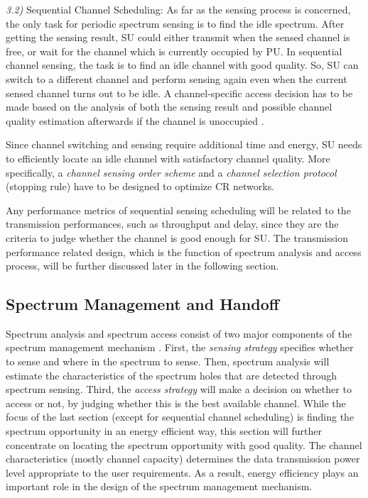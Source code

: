 \documentclass[journal,12pt,onecolumn]{IEEEtran}
\begin{document}
\emph{3.2)} {Sequential Channel Scheduling:} As far as the sensing process is concerned, the only task for periodic spectrum sensing is to find the idle spectrum. After getting the sensing result, SU could either transmit when the sensed channel is free, or wait for the channel which is currently occupied by PU. In sequential channel sensing, the task is to find an idle channel with good quality. So, SU can switch to a different channel and perform sensing again even when the current sensed channel turns out to be idle. A channel-specific access decision has to be made based on the analysis of both the sensing result and possible channel quality estimation afterwards if the channel is unoccupied \cite{4786510}. 

Since channel switching and sensing require additional time and energy, SU needs to efficiently locate an idle channel with satisfactory channel quality. More specifically, a \emph{channel sensing order scheme} and a \emph{channel selection protocol} (stopping rule) have to be designed to optimize CR networks.



Any performance metrics of sequential sensing scheduling will be related to the transmission performances, such as throughput and delay, since they are the criteria to judge whether the channel is good enough for SU. The transmission performance related design, which is the function of spectrum analysis and access process, will be further discussed later in the following section.

\subsection{Spectrum Management and Handoff}
Spectrum analysis and spectrum access consist of two major components of the spectrum management mechanism \cite{HO}. First, the \emph{sensing strategy} specifies whether to sense and where in the spectrum to sense. Then, spectrum analysis will estimate the characteristics of the spectrum holes that are detected through spectrum sensing. Third, the \emph{access strategy} will make a decision on whether to access or not, by judging whether this is the best available channel. While the focus of the last section (except for sequential channel scheduling) is finding the spectrum opportunity in an energy efficient way, this section will further concentrate on locating the spectrum opportunity with good quality. The channel characteristics (mostly channel capacity) determines the data transmission power level appropriate to the user requirements. As a result, energy efficiency plays an important role in the design of the spectrum management mechanism.
\end{document}

